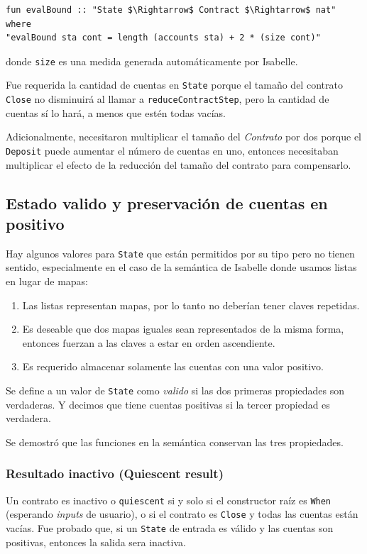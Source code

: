 \documentclass[12pt]{book}
\begin{document}
\begin{lstlisting}[style=Isabelle]
fun evalBound :: "State $\Rightarrow$ Contract $\Rightarrow$ nat" where
"evalBound sta cont = length (accounts sta) + 2 * (size cont)"
\end{lstlisting}
donde \texttt{size} es una medida generada automáticamente por Isabelle. 

Fue requerida la cantidad de cuentas en \texttt{State} porque el tamaño del contrato \texttt{Close} no disminuirá al llamar a \texttt{reduceContractStep}, pero la cantidad de cuentas sí lo hará, a menos que estén todas vacías.

Adicionalmente, necesitaron multiplicar el tamaño del \textit{Contrato} por dos porque el \texttt{Deposit} puede aumentar el número de cuentas en uno, entonces necesitaban multiplicar el efecto de la reducción del tamaño del contrato para compensarlo.

\subsection{Estado valido y preservación de cuentas en positivo}
Hay algunos valores para \texttt{State} que están permitidos por su tipo pero no tienen sentido, especialmente en el caso de la semántica de Isabelle donde usamos listas en lugar de mapas:

\begin{enumerate}
    \item Las listas representan mapas, por lo tanto no deberían tener claves repetidas.
    \item Es deseable que dos mapas iguales sean representados de la misma forma, entonces fuerzan a las claves a estar en orden ascendiente.
    \item Es requerido almacenar solamente las cuentas con una valor positivo.
\end{enumerate}

Se define a un valor de \texttt{State} como \textit{valido} si las dos primeras propiedades son verdaderas. Y decimos que tiene cuentas positivas si la tercer propiedad es verdadera.

Se demostró que las funciones en la semántica conservan las tres propiedades.

\subsubsection{Resultado inactivo (Quiescent result)}
Un contrato es inactivo o \texttt{quiescent} si y solo si el constructor raíz es \texttt{When} (esperando \textit{inputs} de usuario), o si el contrato es \texttt{Close} y todas las cuentas están vacías. Fue probado que, si un \texttt{State} de entrada es válido y las cuentas son positivas, entonces la salida sera inactiva.
\end{document}
